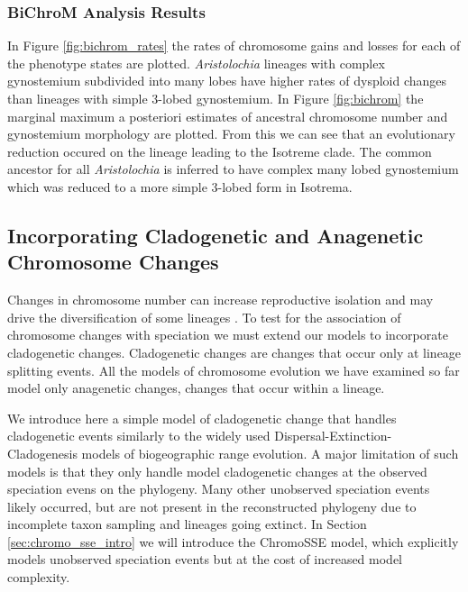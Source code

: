 \subsubsection{BiChroM Analysis Results}

In Figure \ref{fig:bichrom_rates} the rates of
chromosome gains and losses for each of the phenotype states are plotted.
\textit{Aristolochia} lineages with complex gynostemium subdivided into many lobes
have higher rates of dysploid changes than lineages with simple 3-lobed gynostemium.
In Figure \ref{fig:bichrom} the marginal maximum a posteriori estimates of ancestral
chromosome number and gynostemium morphology are plotted.
From this we can see that an evolutionary reduction occured on the lineage
leading to the Isotreme clade. The common ancestor for all
\textit{Aristolochia} is inferred to have complex many lobed
gynostemium which was reduced to a more simple 3-lobed form in Isotrema.  




\subsection{Incorporating Cladogenetic and Anagenetic Chromosome Changes}\label{subsect:clado_simple}

Changes in chromosome number can increase reproductive isolation and may drive the diversification
of some lineages \citep{stebbins1971chromosomal}. 
To test for the association
of chromosome changes with speciation we must extend our models to incorporate cladogenetic
changes. Cladogenetic changes are changes that occur only at lineage splitting events.
All the models of chromosome evolution we have examined so far model
only anagenetic changes, changes that occur within a lineage. 

We introduce here a simple model of cladogenetic change that handles cladogenetic events
similarly to the widely used Dispersal-Extinction-Cladogenesis \citep[DEC;][]{ree08} 
models of biogeographic range evolution.
A major limitation of such models is that they only handle model cladogenetic changes
at the observed speciation evens on the phylogeny.
Many other unobserved speciation events likely occurred, but are not present
in the reconstructed phylogeny due to incomplete taxon sampling and lineages
going extinct. In Section \ref{sec:chromo_sse_intro} we will introduce the
ChromoSSE model, which explicitly models unobserved speciation events but at the
cost of increased model complexity.

